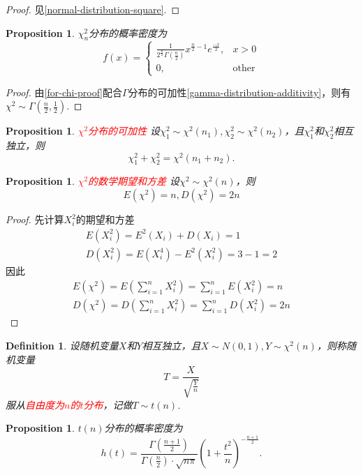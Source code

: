 \documentclass{article}
\newtheorem{proposition}[theorem]{Proposition}
\newtheorem{definition}[theorem]{Definition}
\newcommand{\redt}[1]{\textcolor{red}{#1}}
\begin{document}
\begin{proof}
见\ref{normal-distribution-square}. 
\end{proof}

\begin{proposition}
\rm $\chi_n^2$分布的概率密度为
$$
f(x) =  \left\{
\begin{array}{ll}
\frac{1}{2^\frac{n}{2}\Gamma(\frac{n}{2})} x^{\frac{n}{2}-1}e^{\frac{-x}{2}}, & x > 0 \\
0, & \text{other}
\end{array} \right. 
$$
\end{proposition}

\begin{proof}
由\ref{for-chi-proof}配合$\Gamma$分布的可加性\ref{gamma-distribution-additivity}，则有$\chi^2 \sim \Gamma(\frac{n}{2},\frac{1}{2})$. 
\end{proof}

\begin{proposition}
\rm \redt{$\chi^2$分布的可加性} 设$\chi_1^2 \sim \chi^2(n_1),\chi_2^2 \sim \chi^2(n_2)$，且$\chi_1^2$和$\chi_2^2$相互独立，则
$$
\chi_1^2 + \chi_2^2 = \chi^2(n_1 + n_2). 
$$
\end{proposition}

\begin{proposition}
\rm \redt{$\chi^2$的数学期望和方差} 设$\chi^2 \sim \chi^2(n)$，则
$$
E(\chi^2) = n, D(\chi^2) = 2n
$$
\end{proposition}

\begin{proof}
先计算$X_i^2$的期望和方差
$$
\begin{array}{ll}
E(X_i^2) = E^2(X_i) + D(X_i) = 1 \\
D(X_i^2) = E(X_i^4) - E^2(X_i^2) = 3-1 = 2
\end{array}
$$
因此
$$
\begin{array}{ll}
E(\chi^2) = E(\sum\limits_{i=1}^n X_i^2) =\sum\limits_{i=1}^n E(X_i^2) = n \\
D(\chi^2) = D(\sum\limits_{i=1}^n X_i^2) =\sum\limits_{i=1}^n D(X_i^2) = 2n 
\end{array}
$$
\end{proof}


\begin{definition}
\rm 设随机变量$X$和$Y$相互独立，且$X \sim N(0,1), Y \sim \chi^2(n)$，则称随机变量
$$
T = \frac{X}{\sqrt{\frac{Y}{n}}}
$$
服从\redt{自由度为$n$的$t$分布}，记做$T\sim t(n)$.
\end{definition}

\begin{proposition}
\rm $t(n)$分布的概率密度为
$$
h(t) =\frac{\Gamma(\frac{n+1}{2})}{\Gamma(\frac{n}{2})\cdot \sqrt{n\pi}}\left(1+\frac{t^2}{n}\right)^{-\frac{n+1}{2}}.
$$
\end{proposition}
\end{document}
